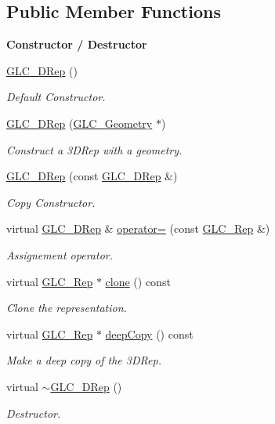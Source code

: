 \subsection*{Public Member Functions}
\begin{Indent}{\bf Constructor / Destructor}\par
\begin{DoxyCompactItemize}
\item 
\hyperlink{class_g_l_c__3_d_rep_a88865051e723c01265cade6d822afe93}{G\-L\-C\-\_\-D\-Rep} ()
\begin{DoxyCompactList}\small\item\em Default Constructor. \end{DoxyCompactList}\item 
\hyperlink{class_g_l_c__3_d_rep_a79044f8562624af2ea8a1758ffe0a9ee}{G\-L\-C\-\_\-D\-Rep} (\hyperlink{class_g_l_c___geometry}{G\-L\-C\-\_\-\-Geometry} $\ast$)
\begin{DoxyCompactList}\small\item\em Construct a 3\-D\-Rep with a geometry. \end{DoxyCompactList}\item 
\hyperlink{class_g_l_c__3_d_rep_aab9a32888f043f24dfcb0d97404f8cbc}{G\-L\-C\-\_\-D\-Rep} (const \hyperlink{class_g_l_c__3_d_rep}{G\-L\-C\-\_\-D\-Rep} \&)
\begin{DoxyCompactList}\small\item\em Copy Constructor. \end{DoxyCompactList}\item 
virtual \hyperlink{class_g_l_c__3_d_rep}{G\-L\-C\-\_\-D\-Rep} \& \hyperlink{class_g_l_c__3_d_rep_a8caf8503d4b67bc3d58f8882be98de29}{operator=} (const \hyperlink{class_g_l_c___rep}{G\-L\-C\-\_\-\-Rep} \&)
\begin{DoxyCompactList}\small\item\em Assignement operator. \end{DoxyCompactList}\item 
virtual \hyperlink{class_g_l_c___rep}{G\-L\-C\-\_\-\-Rep} $\ast$ \hyperlink{class_g_l_c__3_d_rep_a46f07f948dfaba7c885a171451ed2486}{clone} () const 
\begin{DoxyCompactList}\small\item\em Clone the representation. \end{DoxyCompactList}\item 
virtual \hyperlink{class_g_l_c___rep}{G\-L\-C\-\_\-\-Rep} $\ast$ \hyperlink{class_g_l_c__3_d_rep_a0d448ace67203a7361afeb955246eaf8}{deep\-Copy} () const 
\begin{DoxyCompactList}\small\item\em Make a deep copy of the 3\-D\-Rep. \end{DoxyCompactList}\item 
virtual \hyperlink{class_g_l_c__3_d_rep_af1631146aa3a32195b710e8a2cdca244}{$\sim$\-G\-L\-C\-\_\-D\-Rep} ()
\begin{DoxyCompactList}\small\item\em Destructor. \end{DoxyCompactList}\end{DoxyCompactItemize}
\end{Indent}

